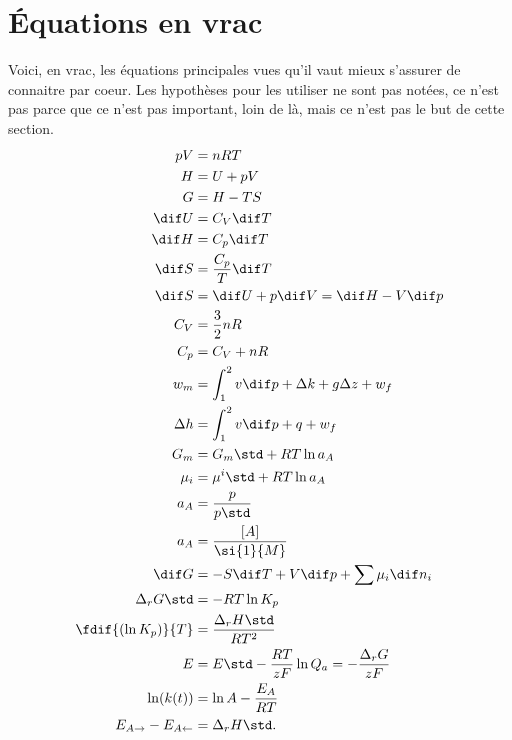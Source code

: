 \section{Équations en vrac}
Voici, en vrac, les équations principales vues qu'il vaut mieux
s'assurer de connaitre par coeur.
Les hypothèses pour les utiliser ne sont pas notées,
ce n'est pas parce que ce n'est pas important,
loin de là, mais ce n'est pas le but de cette section.
\begin{align*}
  pV & = nRT\\
  H & = U + pV\\
  G & = H - TS\\
  \dif U & = C_V \dif T\\
  \dif H & = C_p \dif T\\
  \dif S & = \frac{C_p}{T} \dif T\\
  \dif S & = \dif U + p \dif V = \dif H - V \dif p\\
  C_V & = \frac 32 nR\\
  C_p & = C_V + nR\\
  w_m & = \int_1^2 v\dif p + \Delta k + g\Delta z + w_f\\
  \Delta h & = \int_1^2 v\dif p + q + w_f\\
  G_m & = G_m\std + RT \ln a_A\\
  \mu_i & = {\mu^i}\std + RT \ln a_A\\
  a_A & = \frac{p}{p\std}\\
  a_A & = \frac{[A]}{\si{1}{M}}\\
  \dif G & = -S\dif T + V\dif p + \sum \mu_i \dif n_i\\
  \Delta_r G\std & = -RT\ln K_p\\
  \fdif{(\ln K_p)}{T} & = \frac{\Delta_r H\std}{RT^2}\\
  E & = E\std - \frac{RT}{zF} \ln Q_a = -\frac{\Delta_r G}{zF}\\
  \ln(k(t)) & = \ln A - \frac{E_A}{RT}\\
  E_{A\rightarrow} - E_{A\leftarrow} & = \Delta_r H\std.
\end{align*}


